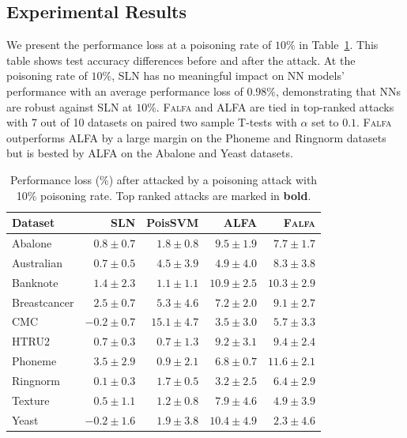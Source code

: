\documentclass[runningheads]{llncs}
\newcommand{\falfa}{\textsc{Falfa}\xspace}
\begin{document}
\subsection{Experimental Results}

We present the performance loss at a poisoning rate of $10\%$ in Table~\ref{tab.err10}.
This table shows test accuracy differences before and after the attack.
At the poisoning rate of $10\%$, SLN has no meaningful impact on NN models' performance with an average performance loss of $0.98\%$,  demonstrating that NNs are robust against SLN at $10\%$.
\falfa and ALFA are tied in top-ranked attacks with 7 out of 10 datasets on paired two sample T-tests with $\alpha$ set to $0.1$.
\falfa outperforms ALFA by a large margin on the Phoneme and Ringnorm datasets but is bested by ALFA on the Abalone and Yeast datasets.

\begin{table}[ht!]
    \footnotesize
    \centering
    \caption[Performance Loss Under Label Poisoning Attacks]{Performance loss (\%) after attacked by a poisoning attack with 10\% poisoning rate. Top ranked attacks are marked in \textbf{bold}.}
    \begin{tabular}{l|@{\hskip2pt}r@{\hskip2pt}|@{\hskip2pt}r@{\hskip2pt}|@{\hskip2pt}r@{\hskip2pt}|@{\hskip2pt}r@{\hskip2pt}}
        \toprule
        Dataset      & SLN          & PoisSVM               & ALFA                  & \falfa                \\
        \midrule
        Abalone      & $0.8\pm0.7$  & $1.8\pm0.8$           & $\mathbf{9.5\pm1.9}$  & $7.7\pm1.7$           \\
        Australian   & $0.7\pm0.5$  & $4.5\pm3.9$           & $\mathbf{4.9\pm4.0}$  & $\mathbf{8.3\pm3.8}$  \\
        Banknote     & $1.4\pm2.3$  & $1.1\pm1.1$           & $\mathbf{10.9\pm2.5}$ & $\mathbf{10.3\pm2.9}$ \\
        Breastcancer & $2.5\pm0.7$  & $5.3\pm4.6$           & $\mathbf{7.2\pm2.0}$  & $\mathbf{9.1\pm2.7}$  \\
        CMC          & $-0.2\pm0.7$ & $\mathbf{15.1\pm4.7}$ & $3.5\pm3.0$           & $5.7\pm3.3$           \\
        HTRU2        & $0.7\pm0.3$  & $0.7\pm1.3$           & $\mathbf{9.2\pm3.1}$  & $\mathbf{9.4\pm2.4}$  \\
        Phoneme      & $3.5\pm2.9$  & $0.9\pm2.1$           & $6.8\pm0.7$           & $\mathbf{11.6\pm2.1}$ \\
        Ringnorm     & $0.1\pm0.3$  & $1.7\pm0.5$           & $3.2\pm2.5$           & $\mathbf{6.4\pm2.9}$  \\
        Texture      & $0.5\pm1.1$  & $1.2\pm0.8$           & $\mathbf{7.9\pm4.6}$  & $\mathbf{4.9\pm3.9}$  \\
        Yeast        & $-0.2\pm1.6$ & $1.9\pm3.8$           & $\mathbf{10.4\pm4.9}$ & $2.3\pm4.6$           \\
        \bottomrule
    \end{tabular}
    \label{tab.err10}
\end{table}
\end{document}
